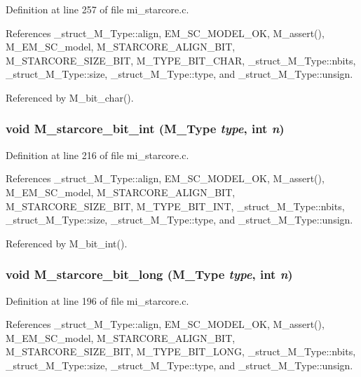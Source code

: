 Definition at line 257 of file mi\_\-starcore.c.

References \_\-struct\_\-M\_\-Type::align, EM\_\-SC\_\-MODEL\_\-OK, M\_\-assert(), M\_\-EM\_\-SC\_\-model, M\_\-STARCORE\_\-ALIGN\_\-BIT, M\_\-STARCORE\_\-SIZE\_\-BIT, M\_\-TYPE\_\-BIT\_\-CHAR, \_\-struct\_\-M\_\-Type::nbits, \_\-struct\_\-M\_\-Type::size, \_\-struct\_\-M\_\-Type::type, and \_\-struct\_\-M\_\-Type::unsign.

Referenced by M\_\-bit\_\-char().
\subsubsection{\setlength{\rightskip}{0pt plus 5cm}void M\_\-starcore\_\-bit\_\-int (\bf{M\_\-Type} {\em type}, int {\em n})}\label{mi__starcore_8c_7c1c0bd4a1ec5495ea544464756c4375}




Definition at line 216 of file mi\_\-starcore.c.

References \_\-struct\_\-M\_\-Type::align, EM\_\-SC\_\-MODEL\_\-OK, M\_\-assert(), M\_\-EM\_\-SC\_\-model, M\_\-STARCORE\_\-ALIGN\_\-BIT, M\_\-STARCORE\_\-SIZE\_\-BIT, M\_\-TYPE\_\-BIT\_\-INT, \_\-struct\_\-M\_\-Type::nbits, \_\-struct\_\-M\_\-Type::size, \_\-struct\_\-M\_\-Type::type, and \_\-struct\_\-M\_\-Type::unsign.

Referenced by M\_\-bit\_\-int().
\subsubsection{\setlength{\rightskip}{0pt plus 5cm}void M\_\-starcore\_\-bit\_\-long (\bf{M\_\-Type} {\em type}, int {\em n})}\label{mi__starcore_8c_2745bfd3774bfc3c8647e2eaf89e9f33}




Definition at line 196 of file mi\_\-starcore.c.

References \_\-struct\_\-M\_\-Type::align, EM\_\-SC\_\-MODEL\_\-OK, M\_\-assert(), M\_\-EM\_\-SC\_\-model, M\_\-STARCORE\_\-ALIGN\_\-BIT, M\_\-STARCORE\_\-SIZE\_\-BIT, M\_\-TYPE\_\-BIT\_\-LONG, \_\-struct\_\-M\_\-Type::nbits, \_\-struct\_\-M\_\-Type::size, \_\-struct\_\-M\_\-Type::type, and \_\-struct\_\-M\_\-Type::unsign.

